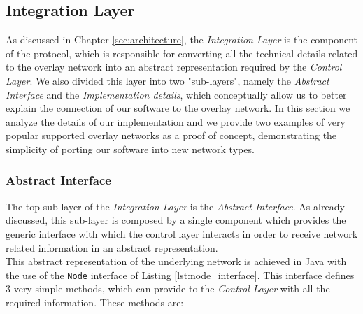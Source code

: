 \documentclass[a4paper,11pt,twoside]{report}
\newcommand{\classname}[1]{\texttt{#1}}
\begin{document}
\subsection{Integration Layer}
\label{sec:integration_l}

As discussed in Chapter \ref{sec:architecture}, the \textit{Integration Layer} is the component of the protocol, which is responsible for converting all the technical details related to the overlay network into an abstract representation required by the \textit{Control Layer}. We also divided this layer into two "sub-layers", namely the \textit{Abstract Interface} and the \textit{Implementation details}, which conceptually allow us to better explain the connection of our software to the overlay network. In this section we analyze the details of our implementation and we provide two examples of very popular supported overlay networks as a proof of concept, demonstrating the simplicity of porting our software into new network types. 

\subsubsection*{Abstract Interface}

The top sub-layer of the \textit{Integration Layer} is the \textit{Abstract Interface}. As already discussed, this sub-layer is composed by a single component which provides the generic interface with which the control layer interacts in order to receive network related information in an abstract representation.\\

This abstract representation of the underlying network is achieved in Java with the use of the \classname{Node} interface of Listing \ref{lst:node_interface}. This interface defines 3 very simple methods, which can provide to the \textit{Control Layer} with all the required information. These methods are:
\end{document}
